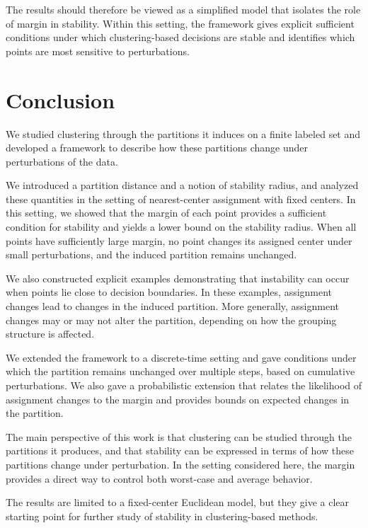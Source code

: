 \documentclass[11pt]{amsart}
\theoremstyle{plain}
\theoremstyle{definition}
\begin{document}
The results should therefore be viewed as a simplified model that isolates the role of margin in stability. Within this setting, the framework gives explicit sufficient conditions under which clustering-based decisions are stable and identifies which points are most sensitive to perturbations.


\section{Conclusion}

We studied clustering through the partitions it induces on a finite labeled set and developed a framework to describe how these partitions change under perturbations of the data.

We introduced a partition distance and a notion of stability radius, and analyzed these quantities in the setting of nearest-center assignment with fixed centers. In this setting, we showed that the margin of each point provides a sufficient condition for stability and yields a lower bound on the stability radius. When all points have sufficiently large margin, no point changes its assigned center under small perturbations, and the induced partition remains unchanged.

We also constructed explicit examples demonstrating that instability can occur when points lie close to decision boundaries. In these examples, assignment changes lead to changes in the induced partition. More generally, assignment changes may or may not alter the partition, depending on how the grouping structure is affected.

We extended the framework to a discrete-time setting and gave conditions under which the partition remains unchanged over multiple steps, based on cumulative perturbations. We also gave a probabilistic extension that relates the likelihood of assignment changes to the margin and provides bounds on expected changes in the partition.

The main perspective of this work is that clustering can be studied through the partitions it produces, and that stability can be expressed in terms of how these partitions change under perturbation. In the setting considered here, the margin provides a direct way to control both worst-case and average behavior.

The results are limited to a fixed-center Euclidean model, but they give a clear starting point for further study of stability in clustering-based methods.
\end{document}
